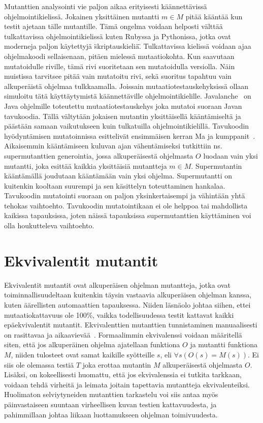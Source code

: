 \documentclass{tktltiki}
\begin{document}
Mutanttien analysointi vie paljon aikaa erityisesti käännettävissä ohjelmointikielissä. Jokainen yksittäinen mutantti $m\in M$ pitää kääntää kun testit ajetaan tälle mutantille. Tämä ongelma voidaan helposti välttää tulkattavissa ohjelmointikielissä kuten Rubyssa ja Pythonissa, jotka ovat moderneja paljon käytettyjä \"skriptauskieliä\". Tulkattavissa kielissä voidaan ajaa ohjelmakoodi sellaisenaan, pitäen mielessä mutaatiokohta. Kun saavutaan mutatoidulle riville, tämä rivi suoritetaan sen mutatoidulla versiolla. Näin muistissa tarvitsee pitää vain mutatoitu rivi, sekä suoritus tapahtuu vain alkuperäistä ohjelmaa tulkkaamalla. Joissain mutaatiotestauskehyksissä ollaan simuloitu tätä käyttäytymistä käännettäville ohjelmointikielille. Javalanche~\cite{} on Java ohjelmille toteutettu mutaatiotestauskehys joka mutatoi suoraan Javan tavukoodia. Tällä vältytään jokaisen mutantin yksittäisellä kääntämiseltä ja päästään samaan vaikutukseen kuin tulkatuilla ohjelmointikielillä. Tavukoodin hyödyntämisen mutatoinnissa esittelivät ensimmäisen kerran Ma ja kumppanit~\cite{}. Aikaisemmin kääntämiseen kuluvan ajan vähentämiseksi tutkittiin ns. supermutanttien generointia, jossa alkuperäisestä ohjelmasta $O$ luodaan vain yksi mutantti, joka esittää kaikkia yksittäisiä mutantteja $m\in M$. Supermutantin kääntämällä joudutaan kääntämään vain yksi ohjelma. Supermutantti on kuitenkin kooltaan suurempi ja sen käsittelyn toteuttaminen hankalaa. Tavukoodin mutatointi suoraan on paljon yksinkertaisempi ja vähintään yhtä tehokas vaihtoehto. Tavukoodin mutatointikaan ei ole helppoa tai mahdollista kaikissa tapauksissa, joten näissä tapauksissa supermutanttien käyttäminen voi olla houkutteleva vaihtoehto.

\section{Ekvivalentit mutantit}
Ekvivalentit mutantit ovat alkuperäisen ohjelman mutantteja, jotka ovat toiminnallisuudeltaan kuitenkin täysin vastaavia alkuperäisen ohjelman kanssa, kuten äärellisten automaattien tapauksessa. Niiden läsnäolo johtaa siihen, ettei mutaatiokattavuus ole 100\%, vaikka todellisuudessa testit kattavat kaikki epäekvivalentit mutantit. Ekvivalenttien mutanttien tunnistaminen manuaalisesti on rasittavaa ja aikaavievää~\cite{}. Formaalimmin ekvivalenssi voidaan määritellä siten, että jos alkuperäinen ohjelma ajatellaan funktiona $O$ ja mutantti funktiona $M$, niiden tulosteet ovat samat kaikille syötteille $s$, eli $\forall s(O(s) = M(s))$. Ei siis ole olemassa testiä $T$ joka erottaa mutantin $M$ alkuperäisestä ohjelmasta $O$. Lisäksi, on kokeellisesti huomattu, että jos ekvivalenssia ei tutkita tarkkaan, voidaan tehdä virheitä ja leimata joitain tapettavia mutantteja ekvivalenteiksi. Huolimaton selviytyneiden mutanttien tarkastelu voi siis antaa myös päinvastaiseen suuntaan virheellisen kuvan testien kattavuudesta, ja pahimmillaan johtaa liikaan luottamukseen ohjelman toimivuudesta. %
\end{document}
